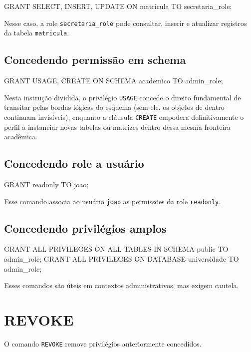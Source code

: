 \begin{sqlcode}
GRANT SELECT, INSERT, UPDATE ON matricula TO secretaria_role;
\end{sqlcode}

Nesse caso, a role \texttt{secretaria\_role} pode consultar, inserir e atualizar registros da tabela \texttt{matricula}.

\subsection{Concedendo permissão em schema}

\begin{sqlcode}
GRANT USAGE, CREATE ON SCHEMA academico TO admin_role;
\end{sqlcode}

Nesta instrução dividida, o privilégio \texttt{USAGE} concede o direito fundamental de transitar pelas bordas lógicas do esquema (sem ele, os objetos de dentro continuam invisíveis), enquanto a cláusula \texttt{CREATE} empodera definitivamente o perfil a instanciar novas tabelas ou matrizes dentro dessa mesma fronteira acadêmica.

\subsection{Concedendo role a usuário}

\begin{sqlcode}
GRANT readonly TO joao;
\end{sqlcode}

Esse comando associa ao usuário \texttt{joao} as permissões da role \texttt{readonly}.

\subsection{Concedendo privilégios amplos}

\begin{sqlcode}
GRANT ALL PRIVILEGES ON ALL TABLES IN SCHEMA public TO admin_role;
GRANT ALL PRIVILEGES ON DATABASE universidade TO admin_role;
\end{sqlcode}

Esses comandos são úteis em contextos administrativos, mas exigem cautela.

\section{REVOKE}

O comando \texttt{REVOKE} remove privilégios anteriormente concedidos.

